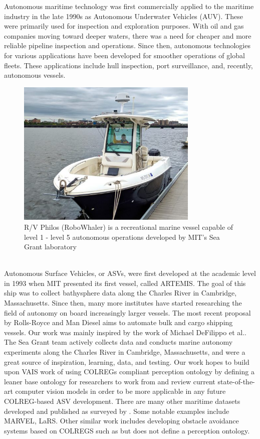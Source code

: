Autonomous maritime technology was first commercially applied to the maritime industry in the late 1990s as Autonomous Underwater Vehicles (AUV). These were primarily used for inspection and exploration purposes. With oil and gas companies moving toward deeper waters, there was a need for cheaper and more reliable pipeline inspection and operations. Since then, autonomous technologies for various applications have been developed for smoother operations of global fleets. These applications include hull inspection, port surveillance, and, recently, autonomous vessels. \cite{ghaderi2019autonomous}
\begin{figure}[H]
    \centering
    \includegraphics[width=\textwidth,height=7cm,keepaspectratio=true]{src/Images/robo_whaler.jpg}
    \caption{
     R/V Philos (RoboWhaler\cite{defilippo2021robowhaler}) is a recreational marine vessel capable of level 1 - level 5 autonomous operations developed by MIT's Sea Grant laboratory}
\end{figure}
\\

Autonomous Surface Vehicles, or ASVs, were first developed at the academic level in 1993 when MIT presented its first vessel, called ARTEMIS. The goal of this ship was to collect bathysphere data along the Charles River in Cambridge, Massachusetts. Since then, many more institutes have started researching the field of autonomy on board increasingly larger vessels. The most recent proposal by Rolls-Royce and Man Diesel aims to automate bulk and cargo shipping vessels\cite{schiaretti2017survey}. Our work was mainly inspired by the work of Michael DeFilippo et al.\cite{defilippo2021robowhaler}. The Sea Grant team actively collects data and conducts marine autonomy experiments along the Charles River in Cambridge, Massachusetts, and were a great source of inspiration, learning, data, and testing. Our work hopes to build upon VAIS\cite{Zhang_2015_CVPR_Workshops} work of using COLREGs compliant perception ontology by defining a leaner base ontology for researchers to work from and review current state-of-the-art computer vision models in order to be more applicable in any future COLREG-based ASV development. There are many other maritime datasets developed and published as surveyed by \cite{su2023survey}. Some notable examples include MARVEL\cite{gundogdu2017marvel}, LaRS\cite{Zust_2023_ICCV}. Other similar work includes developing obstacle avoidance systems based on COLREGS such as \cite{zhao2019colregs}\cite{kuwata2013safe}\cite{naeem2012colregs} but does not define a perception ontology.

